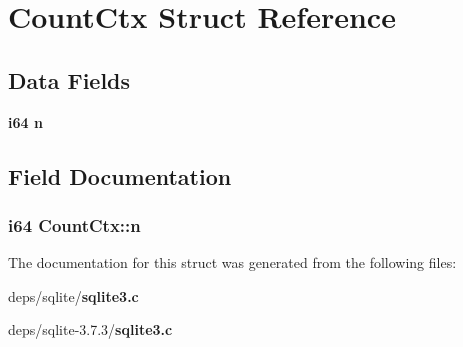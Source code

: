 \section{Count\-Ctx Struct Reference}
\label{structCountCtx}
\subsection*{Data Fields}
\begin{CompactItemize}
\item 
\bf{i64} \bf{n}
\end{CompactItemize}


\subsection{Field Documentation}
\subsubsection{\setlength{\rightskip}{0pt plus 5cm}\bf{i64} \bf{Count\-Ctx::n}}\label{structCountCtx_15abd9f9104334621e31cd632ccdc601}




The documentation for this struct was generated from the following files:\begin{CompactItemize}
\item 
deps/sqlite/\bf{sqlite3.c}\item 
deps/sqlite-3.7.3/\bf{sqlite3.c}\end{CompactItemize}
